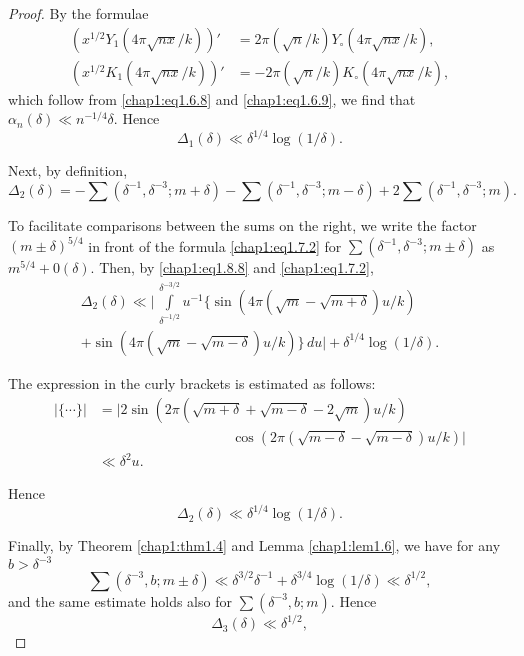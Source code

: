 \begin{proof}
By the formulae
\begin{align}
(x^{1/2}Y_1(4\pi\sqrt{nx}/k))' &= 2\pi(\sqrt{n}/k)Y_\circ(4\pi
\sqrt{nx}/k),\label{chap1:eq1.8.5}\\
(x^{1/2}K_1(4\pi\sqrt{nx}/k))' &= -2\pi(\sqrt{n}/k)K_\circ
(4\pi\sqrt{nx}/k),\label{chap1:eq1.8.6} 
\end{align}
which follow from \eqref{chap1:eq1.6.8} and \eqref{chap1:eq1.6.9}, we
find that $\alpha_n(\delta)\ll n^{-1/4}\delta$. Hence
\begin{equation}\label{chap1:eq1.8.7}
\Delta_1(\delta)\ll \delta^{1/4}\log(1/\delta).
\end{equation}

Next, by definition,
{\fontsize{10}{12}\selectfont
\begin{equation}\label{chap1:eq1.8.8}
\Delta_2(\delta)=-\sum\left(\delta^{-1},\delta^{-3};m+\delta\right)
-\sum\left(\delta^{-1},\delta^{-3};m-\delta\right)+2\sum
\left(\delta^{-1},\delta^{-3};m\right).
\end{equation}}

To facilitate comparisons between the sums on the right, we write the
factor $(m\pm\delta)^{5/4}$ in front of the formula
\eqref{chap1:eq1.7.2} for $\sum(\delta^{-1},\delta^{-3};m\pm\delta)$
as\pageoriginale $m^{5/4}+0(\delta)$. Then, by \eqref{chap1:eq1.8.8}
and \eqref{chap1:eq1.7.2},
\begin{multline*}
\Delta_2(\delta)\ll \Bigg|\, \int\limits_{\delta^{-1/2}}^{\delta^{-3/2}}
u^{-1}\Big\{\sin(4\pi(\sqrt{m}-\sqrt{m+\delta})u/k)\\
+\sin(4\pi (\sqrt{m}-\sqrt{m-\delta})u/k)\Big\}\,du\Bigg|
+\delta^{1/4}\log(1/\delta).
\end{multline*}

The expression in the curly brackets is estimated as follows:
\begin{align*}
|\{\cdots\}|&
=|2\sin \left(2\pi
\left(\sqrt{m+\delta}+\sqrt{m-\delta}-2\sqrt{m}\right)u/k\right) \\
& \hspace{4cm}\cos
\left(2\pi\left(\sqrt{m-\delta}-\sqrt{m-\delta}\right)u/k\right)|\\
& \ll \delta^2u.
\end{align*}

Hence 
\begin{equation}\label{chap1:eq1.8.9}
\Delta_2(\delta)\ll \delta^{1/4}\log (1/\delta).
\end{equation}

Finally, by Theorem \ref{chap1:thm1.4} and Lemma \ref{chap1:lem1.6},
we have for any $b>\delta^{-3}$
$$
\sum(\delta^{-3},b;m\pm\delta)\ll\delta^{3/2}\delta^{-1}+\delta^{3/4}
\log(1/\delta)\ll \delta^{1/2},
$$
and the same estimate holds also for $\sum(\delta^{-3},b;m)$. Hence
\begin{equation}\label{chap1:eq1.8.10}
\Delta_3(\delta)\ll \delta^{1/2},
\end{equation}


\end{proof}
